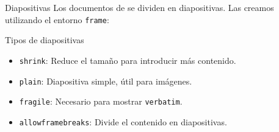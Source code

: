 \begin{frame}{Diapositivas}
  Los documentos de \beamer se dividen en diapositivas. Las creamos utilizando
  el entorno \texttt{frame}:


  \pause
  \begin{block}{Tipos de diapositivas}
    \begin{itemize}
      \item \texttt{shrink}:  Reduce el tamaño para introducir más contenido.
      \item \texttt{plain}:   Diapositiva simple, útil para imágenes.
      \item \texttt{fragile}: Necesario para mostrar \texttt{verbatim}.
      \item \texttt{allowframebreaks}: Divide el contenido en diapositivas.
    \end{itemize}
  \end{block}
\end{frame}
